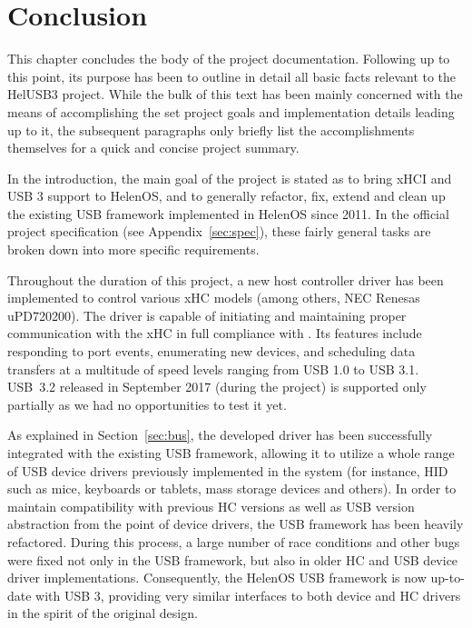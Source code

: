 \chapter{Conclusion}

This chapter concludes the body of the project documentation. Following up to
this point, its purpose has been to outline in detail all basic facts relevant
to the HelUSB3 project. While the bulk of this text has been mainly concerned
with the means of accomplishing the set project goals and implementation details
leading up to it, the subsequent paragraphs only briefly list the
accomplishments themselves for a quick and concise project summary.

In the introduction, the main goal of the project is stated as to bring xHCI and
USB 3 support to HelenOS, and to generally refactor, fix, extend and clean up the
existing USB framework implemented in HelenOS since 2011. In the official
project specification (see Appendix~\ref{sec:spec}), these fairly general tasks
are broken down into more specific requirements.

Throughout the duration of this project, a new host controller driver has been
implemented to control various xHC models (among others, NEC Renesas
uPD720200). The driver is capable of initiating and maintaining proper
communication with the xHC in full compliance with \cite{xhci}. Its features
include responding to port events, enumerating new devices, and scheduling data
transfers at a multitude of speed levels ranging from USB 1.0 to USB 3.1.
USB~3.2 released in September 2017 (during the project) is supported only
partially as we had no opportunities to test it yet.

As explained in Section~\ref{sec:bus}, the developed driver has been successfully
integrated with the existing USB framework, allowing it to utilize a whole range
of USB device drivers previously implemented in the system (for instance, HID
such as mice, keyboards or tablets, mass storage devices and others). In order
to maintain compatibility with previous HC versions as well as USB version
abstraction from the point of device drivers, the USB framework has been heavily
refactored. During this process, a large number of race conditions and other
bugs were fixed not only in the USB framework, but also in older HC and USB
device driver implementations. Consequently, the HelenOS USB framework is now
up-to-date with USB 3, providing very similar interfaces to both device and HC
drivers in the spirit of the original design.

